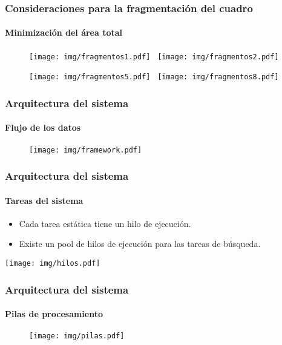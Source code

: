 \documentclass[11pt,a4paper,spanish]{beamer}
\begin{document}
\begin{frame}

\frametitle{Consideraciones para la fragmentación del cuadro}

\framesubtitle{Minimización del área total}

\begin{figure}[h]

	\texttt{[image: img/fragmentos1.pdf]}~
	\texttt{[image: img/fragmentos2.pdf]}

	\texttt{[image: img/fragmentos5.pdf]}~
	\texttt{[image: img/fragmentos8.pdf]}

\end{figure}

\end{frame}

\begin{frame}

\frametitle{Arquitectura del sistema}

\framesubtitle{Flujo de los datos}

\begin{figure}[h]

	\centering

	\texttt{[image: img/framework.pdf]}

\end{figure}

\end{frame}

\begin{frame}

\frametitle{Arquitectura del sistema}

\framesubtitle{Tareas del sistema}

\begin{itemize}

	\item Cada tarea estática tiene un hilo de ejecución.

	\item Existe un pool de hilos de ejecución para las tareas de búsqueda.

\end{itemize}

\texttt{[image: img/hilos.pdf]}

\end{frame}

\begin{frame}

\frametitle{Arquitectura del sistema}

\framesubtitle{Pilas de procesamiento}

\begin{figure}[h]

	\centering

	\texttt{[image: img/pilas.pdf]}

\end{figure}

\end{frame}
\end{document}
